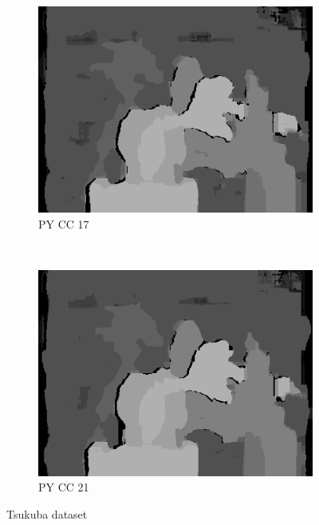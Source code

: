\begin{figure}
\begin{subfigure}[b]{0.23\textwidth}
    \includegraphics[width=\textwidth]{images/stereo-pairs/tsukuba_pyramid_crosschecked_17.png}
    \caption{PY CC 17}
  \end{subfigure}
  ~
  \begin{subfigure}[b]{0.23\textwidth}
    \centering
    \includegraphics[width=\textwidth]{images/stereo-pairs/tsukuba_pyramid_crosschecked_21.png}
    \caption{PY CC 21}
  \end{subfigure}

  \caption{Tsukuba dataset}

\end{figure}



